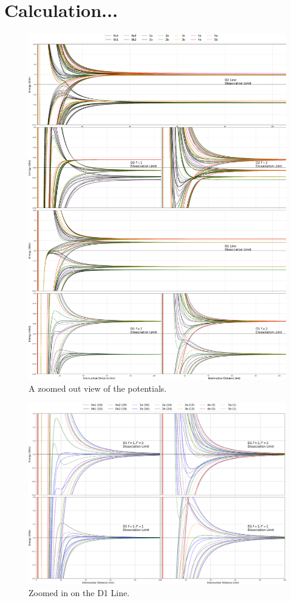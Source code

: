 \documentclass[prl, longbibliography]{revtex4-2}
\begin{document}
\section{Calculation...}

\begin{figure}
  \includegraphics[width=\linewidth]{Symmetrized_Hyperfine_Splitting_Big_Picture.png}
  \caption{A zoomed out view of the potentials.}
  \label{fig:boat1}
\end{figure}
\begin{figure}
  \includegraphics[width=\linewidth]{Symmetrized_Hyperfine_Splitting_D1_Zoom.png}
  \caption{Zoomed in on the D1 Line.}
  \label{fig:boat1}
\end{figure}
\end{document}
